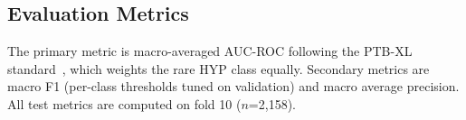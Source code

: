 \subsection{Evaluation Metrics}

The primary metric is macro-averaged AUC-ROC following the PTB-XL
standard~\cite{strodthoff2021}, which weights the rare HYP class equally.
Secondary metrics are macro F1 (per-class thresholds tuned on validation) and
macro average precision. All test metrics are computed on fold 10
($n$=2{,}158).
